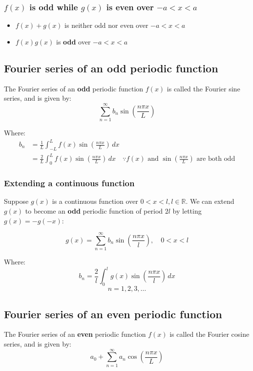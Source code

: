 \documentclass[11pt]{article}
\begin{document}
\subsubsection{\(f(x)\) is odd while \(g(x)\) is even over \(- a < x < a\)}
\label{sec:org82d7587}
\begin{itemize}
\item \(f(x) + g(x)\) is neither odd nor even over \(- a < x < a\)
\item \(f(x) g(x)\) is \textbf{odd} over \(- a < x < a\)
\end{itemize}

 \newpage
\subsection{Fourier series of an odd periodic function}
\label{sec:orge7b9ec8}
The Fourier series of an \textbf{odd} periodic function \(f(x)\) is called the Fourier sine series, and is given by:
\[\sum_{n = 1}^{\infty} b_n \sin \left( \frac{n \pi x}{L} \right)\]

Where:
\begin{align*}
b_n &= \frac{1}{L} \int_{-L}^{L} f(x) \sin \left( \frac{n \pi x}{L} \right) \, dx \\
&= \frac{2}{L} \int_0^L f(x) \sin \left( \frac{n \pi x}{L} \right) \, dx \quad \because f(x) \text{ and } \sin \left( \frac{n \pi x}{L} \right) \text{ are both odd}
\end{align*}
\subsubsection{Extending a continuous function}
\label{sec:orgf91f5f0}
Suppose \(g(x)\) is a continuous function over \(0 < x < l, l \in \mathbb{R}\). We can extend \(g(x)\) to become an \textbf{odd} periodic function of period \(2l\) by letting \(g(x) = - g(-x)\):

\[g(x) = \sum_{n = 1}^{\infty} b_n \sin \left( \frac{n \pi x}{l} \right), \quad 0 < x < l\]

Where:
\[b_n = \frac{2}{l} \int_0^l g(x) \sin \left( \frac{n \pi x}{l} \right) \, dx\]
\[n = 1, 2, 3, \ldots\]

 \newpage
\subsection{Fourier series of an even periodic function}
\label{sec:orga0f9651}
The Fourier series of an \textbf{even} periodic function \(f(x)\) is called the Fourier cosine series, and is given by:
\[a_0 + \sum_{n = 1}^{\infty} a_n \cos \left( \frac{n \pi x}{L} \right)\]
\end{document}
